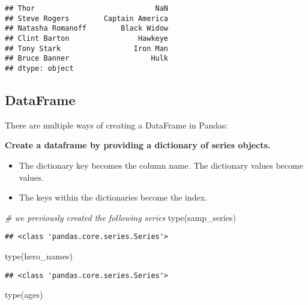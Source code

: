 \documentclass[
]{book}
\newenvironment{Shaded}{\begin{snugshade}}{\end{snugshade}}
\newcommand{\BuiltInTok}[1]{#1}
\newcommand{\CommentTok}[1]{\textcolor[rgb]{0.56,0.35,0.01}{\textit{#1}}}
\newcommand{\NormalTok}[1]{#1}
\begin{document}
\begin{verbatim}
## Thor                            NaN
## Steve Rogers        Captain America
## Natasha Romanoff        Black Widow
## Clint Barton                Hawkeye
## Tony Stark                 Iron Man
## Bruce Banner                   Hulk
## dtype: object
\end{verbatim}

\hypertarget{dataframe}{%
\subsection{DataFrame}\label{dataframe}}

There are multiple ways of creating a DataFrame in Pandas:

\textbf{Create a dataframe by providing a dictionary of series objects.}

\begin{itemize}
\item
  The dictionary key becomes the column name. The dictionary values become values.
\item
  The keys within the dictionaries become the index.
\end{itemize}

\begin{Shaded}
\begin{Highlighting}[]
\CommentTok{\# we previously created the following series}
\BuiltInTok{type}\NormalTok{(samp\_series)}
\end{Highlighting}
\end{Shaded}

\begin{verbatim}
## <class 'pandas.core.series.Series'>
\end{verbatim}

\begin{Shaded}
\begin{Highlighting}[]
\BuiltInTok{type}\NormalTok{(hero\_names)}
\end{Highlighting}
\end{Shaded}

\begin{verbatim}
## <class 'pandas.core.series.Series'>
\end{verbatim}

\begin{Shaded}
\begin{Highlighting}[]
\BuiltInTok{type}\NormalTok{(ages)}
\end{Highlighting}
\end{Shaded}
\end{document}
